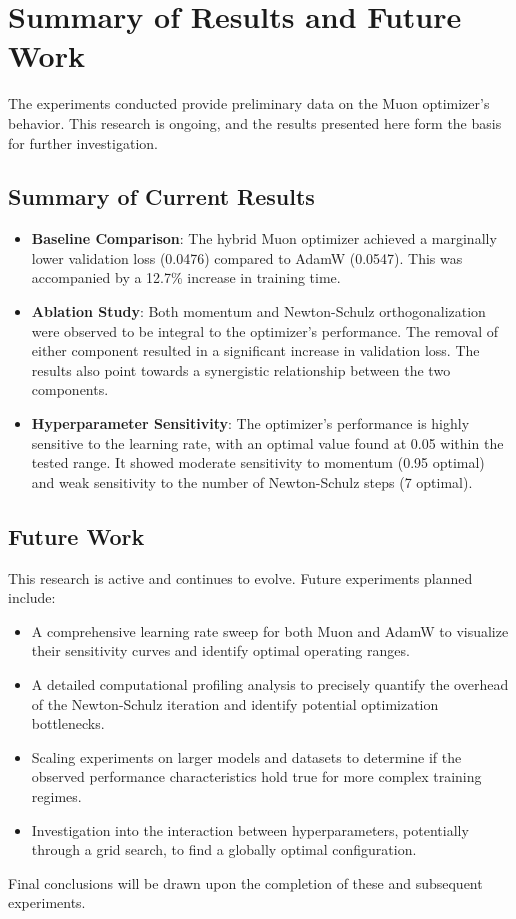 \documentclass[11pt, a4paper]{article}
\begin{document}
\section{Summary of Results and Future Work}
The experiments conducted provide preliminary data on the Muon optimizer's behavior. This research is ongoing, and the results presented here form the basis for further investigation.

\subsection{Summary of Current Results}
\begin{itemize}
    \item \textbf{Baseline Comparison}: The hybrid Muon optimizer achieved a marginally lower validation loss (0.0476) compared to AdamW (0.0547). This was accompanied by a 12.7\% increase in training time.
    \item \textbf{Ablation Study}: Both momentum and Newton-Schulz orthogonalization were observed to be integral to the optimizer's performance. The removal of either component resulted in a significant increase in validation loss. The results also point towards a synergistic relationship between the two components.
    \item \textbf{Hyperparameter Sensitivity}: The optimizer's performance is highly sensitive to the learning rate, with an optimal value found at 0.05 within the tested range. It showed moderate sensitivity to momentum (0.95 optimal) and weak sensitivity to the number of Newton-Schulz steps (7 optimal).
\end{itemize}

\subsection{Future Work}
This research is active and continues to evolve. Future experiments planned include:
\begin{itemize}
    \item A comprehensive learning rate sweep for both Muon and AdamW to visualize their sensitivity curves and identify optimal operating ranges.
    \item A detailed computational profiling analysis to precisely quantify the overhead of the Newton-Schulz iteration and identify potential optimization bottlenecks.
    \item Scaling experiments on larger models and datasets to determine if the observed performance characteristics hold true for more complex training regimes.
    \item Investigation into the interaction between hyperparameters, potentially through a grid search, to find a globally optimal configuration.
\end{itemize}
Final conclusions will be drawn upon the completion of these and subsequent experiments.
\end{document}
